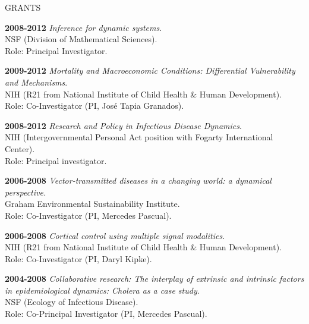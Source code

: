 \begin{mylist} {GRANTS}
\item{\bf 2008-2012 } {\em Inference for dynamic systems}.\\
NSF (Division of Mathematical Sciences).\\
Role: Principal Investigator.

\item{\bf 2009-2012 } {\em Mortality and Macroeconomic Conditions: Differential Vulnerability and Mechanisms}.\\
NIH (R21 from National Institute of Child Health \& Human Development).\\
Role: Co-Investigator (PI, Jos\'{e} Tapia Granados). 

\item{\bf 2008-2012 } {\em Research and Policy in Infectious Disease Dynamics}.\\
NIH (Intergovernmental Personal Act position with Fogarty International Center).\\
Role: Principal investigator.

\item{\bf 2006-2008 } {\em Vector-transmitted diseases in a changing world: a dynamical perspective.}\\
Graham Environmental Sustainability Institute.\\
Role: Co-Investigator (PI, Mercedes Pascual). 

\item{\bf 2006-2008 } {\em Cortical control using multiple signal modalities}.\\
NIH (R21 from National Institute of Child Health \& Human Development).\\
Role: Co-Investigator (PI, Daryl Kipke).

\item{\bf 2004-2008 } {\em Collaborative research: The
  interplay of extrinsic and intrinsic factors in epidemiological
  dynamics: Cholera as a case study}.\\
NSF (Ecology of Infectious Disease).\\
Role: Co-Principal Investigator (PI, Mercedes Pascual).

 
\end{mylist}

